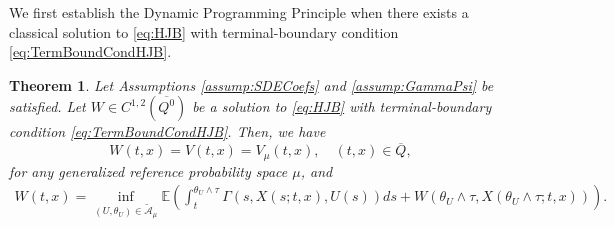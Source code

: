 \documentclass[amscd,amssymb,11pt]{article}
\newtheorem{theorem}{Theorem}
\numberwithin{theorem}{section}
\numberwithin{equation}{section}
\begin{document}
We first establish the Dynamic Programming Principle when there exists a classical solution to \eqref{eq:HJB} with terminal-boundary condition \eqref{eq:TermBoundCondHJB}.
\begin{theorem}\label{thm:DPSmooth}
Let Assumptions \ref{assump:SDECoefs} and \ref{assump:GammaPsi} be satisfied. Let $W\in C^{1,2}(\overline{Q^{0}})$ be a solution to \eqref{eq:HJB} with terminal-boundary condition \eqref{eq:TermBoundCondHJB}. Then, we have
\begin{equation}\label{eq:WVVmu}
W(t,x)=V(t,x)=V_{\mu}(t,x),\quad (t,x)\in \overline{Q},
\end{equation}
for any generalized reference probability space $\mu$, and
\begin{align}\label{eq:DP}
W(t,x)=\inf_{(U,\theta_{U})\in\widetilde{\mathcal{A}}_{\mu}}\mathbb{E}\left(\int_{t}^{\theta_{U}\wedge\tau}\Gamma\left(s,X(s;t,x),U(s)\right)ds+W\left(\theta_{U}\wedge\tau,X(\theta_{U}\wedge\tau;t,x)\right)\right).
\end{align}
\end{theorem}
\end{document}
